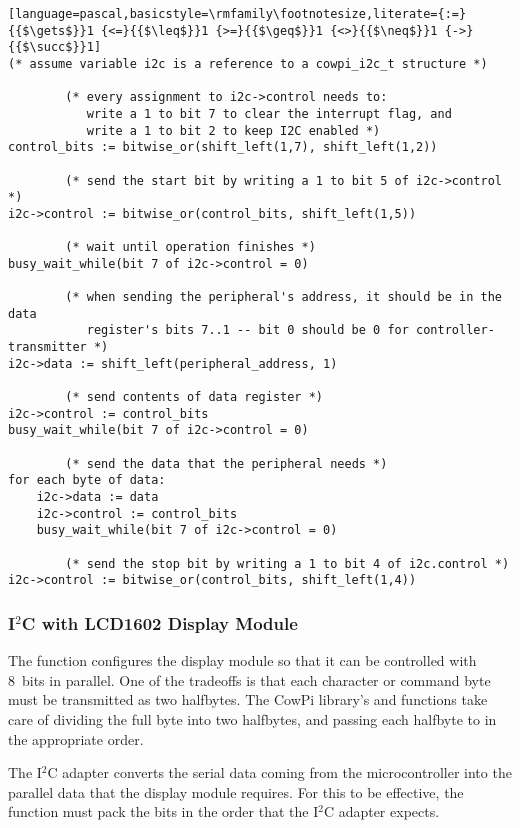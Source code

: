 \begin{lstlisting}[language=pascal,basicstyle=\rmfamily\footnotesize,literate={:=}{{$\gets$}}1 {<=}{{$\leq$}}1 {>=}{{$\geq$}}1 {<>}{{$\neq$}}1 {->}{{$\succ$}}1]
(* assume variable i2c is a reference to a cowpi_i2c_t structure *)

        (* every assignment to i2c->control needs to:
           write a 1 to bit 7 to clear the interrupt flag, and
           write a 1 to bit 2 to keep I2C enabled *)
control_bits := bitwise_or(shift_left(1,7), shift_left(1,2))

        (* send the start bit by writing a 1 to bit 5 of i2c->control *)
i2c->control := bitwise_or(control_bits, shift_left(1,5))

        (* wait until operation finishes *)
busy_wait_while(bit 7 of i2c->control = 0)

        (* when sending the peripheral's address, it should be in the data
           register's bits 7..1 -- bit 0 should be 0 for controller-transmitter *)
i2c->data := shift_left(peripheral_address, 1)

        (* send contents of data register *)
i2c->control := control_bits
busy_wait_while(bit 7 of i2c->control = 0)

        (* send the data that the peripheral needs *)
for each byte of data:
    i2c->data := data
    i2c->control := control_bits
    busy_wait_while(bit 7 of i2c->control = 0)

        (* send the stop bit by writing a 1 to bit 4 of i2c.control *)
i2c->control := bitwise_or(control_bits, shift_left(1,4))
\end{lstlisting}

\subsubsection{I$^2$C with LCD1602 Display Module} \label{subsubsec:send_halfbyte}

The  function configures the display module so that it can be controlled with 8~bits in parallel.
One of the tradeoffs is that each character or command byte must be transmitted as two halfbytes.
The CowPi library's  and  functions take care of dividing the full byte into two halfbytes, and passing each halfbyte to  in the appropriate order.

The I$^2$C adapter\cite{i2cAdapter} converts the serial data coming from the microcontroller into the parallel data that the display module requires.
For this to be effective, the  function must pack the bits in the order that the I$^2$C adapter expects.

